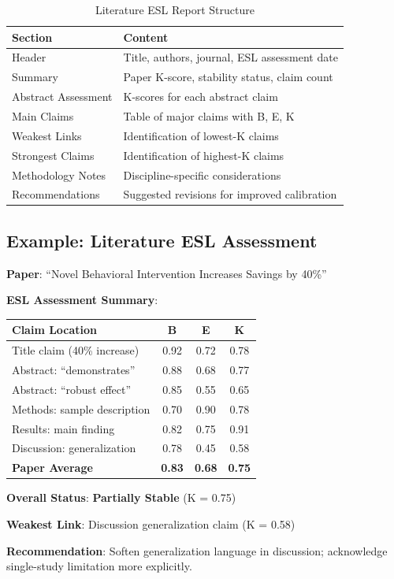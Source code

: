 \documentclass[11pt,a4paper]{article}
\theoremstyle{remark}
\begin{document}
\begin{table}[h]
\centering
\caption{Literature ESL Report Structure}
\label{tab:lit-report}
\begin{tabular}{lp{8cm}}
\toprule
\textbf{Section} & \textbf{Content} \\
\midrule
Header & Title, authors, journal, ESL assessment date \\
Summary & Paper K-score, stability status, claim count \\
Abstract Assessment & K-scores for each abstract claim \\
Main Claims & Table of major claims with B, E, K \\
Weakest Links & Identification of lowest-K claims \\
Strongest Claims & Identification of highest-K claims \\
Methodology Notes & Discipline-specific considerations \\
Recommendations & Suggested revisions for improved calibration \\
\bottomrule
\end{tabular}
\end{table}

\subsection{Example: Literature ESL Assessment}

\begin{examplebox}[title={Literature ESL: Sample Assessment}]
\textbf{Paper}: ``Novel Behavioral Intervention Increases Savings by 40\%''

\textbf{ESL Assessment Summary}:
\begin{center}
\begin{tabular}{lccc}
\toprule
\textbf{Claim Location} & \textbf{B} & \textbf{E} & \textbf{K} \\
\midrule
Title claim (40\% increase) & 0.92 & 0.72 & 0.78 \\
Abstract: ``demonstrates'' & 0.88 & 0.68 & 0.77 \\
Abstract: ``robust effect'' & 0.85 & 0.55 & 0.65 \\
Methods: sample description & 0.70 & 0.90 & 0.78 \\
Results: main finding & 0.82 & 0.75 & 0.91 \\
Discussion: generalization & 0.78 & 0.45 & 0.58 \\
\midrule
\textbf{Paper Average} & \textbf{0.83} & \textbf{0.68} & \textbf{0.75} \\
\bottomrule
\end{tabular}
\end{center}

\textbf{Overall Status}: \textcolor{eslorange}{\textbf{Partially Stable}} (K = 0.75)

\textbf{Weakest Link}: Discussion generalization claim (K = 0.58)

\textbf{Recommendation}: Soften generalization language in discussion; acknowledge single-study limitation more explicitly.
\end{examplebox}
\end{document}
